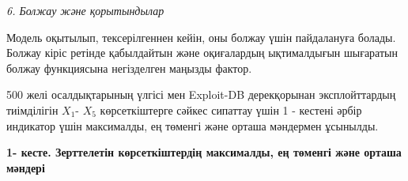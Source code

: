 \emph{6. Болжау және қорытындылар}

Модель оқытылып, тексерілгеннен кейін, оны болжау үшін пайдалануға
болады. Болжау кіріс ретінде қабылдайтын және оқиғалардың ықтималдығын
шығаратын болжау функциясына негізделген маңызды фактор.

500 желі осалдықтарының үлгісі мен Exploit-DB дерекқорынан
эксплойттардың тиімділігін \(X_{1}\)- \(X_{5}\) көрсеткіштерге сәйкес
сипаттау үшін 1 - кестені әрбір индикатор үшін максималды, ең төменгі
және орташа мәндермен ұсынылды.

{\bfseries 1- кесте. Зерттелетін көрсеткіштердің максималды, ең төменгі
және орташа мәндері}


